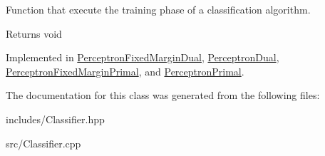 Function that execute the training phase of a classification algorithm. 

\begin{DoxyReturn}{Returns}
void 
\end{DoxyReturn}


Implemented in \hyperlink{class_perceptron_fixed_margin_dual_aa095c90a3d04f70e1cf2e38e2afa769b}{Perceptron\+Fixed\+Margin\+Dual}, \hyperlink{class_perceptron_dual_a91b0bd1e86a6003b57b96199266cdc3e}{Perceptron\+Dual}, \hyperlink{class_perceptron_fixed_margin_primal_ad41c2a42c4a819c03bf9879110b0f99f}{Perceptron\+Fixed\+Margin\+Primal}, and \hyperlink{class_perceptron_primal_a17f817a72fc7d61d1686ea77f7f9e84d}{Perceptron\+Primal}.



The documentation for this class was generated from the following files\+:\begin{DoxyCompactItemize}
\item 
includes/Classifier.\+hpp\item 
src/Classifier.\+cpp\end{DoxyCompactItemize}
